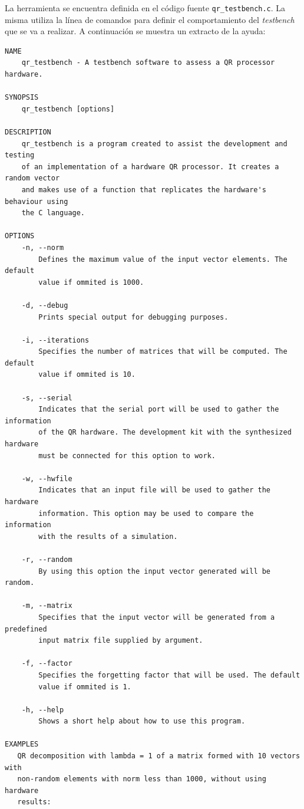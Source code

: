 La herramienta se encuentra definida en el código fuente \verb;qr_testbench.c;. La misma utiliza la línea de comandos para definir el comportamiento del \textit{testbench} que se va a realizar. A continuación se muestra un extracto de la ayuda:

\begin{lstlisting}[style=C]
NAME  
    qr_testbench - A testbench software to assess a QR processor hardware.

SYNOPSIS
    qr_testbench [options]
    
DESCRIPTION
    qr_testbench is a program created to assist the development and testing
    of an implementation of a hardware QR processor. It creates a random vector
    and makes use of a function that replicates the hardware's behaviour using
    the C language. 

OPTIONS
    -n, --norm    
        Defines the maximum value of the input vector elements. The default 
        value if ommited is 1000.
    
    -d, --debug
        Prints special output for debugging purposes.

    -i, --iterations
        Specifies the number of matrices that will be computed. The default 
        value if ommited is 10.
    
    -s, --serial
        Indicates that the serial port will be used to gather the information
        of the QR hardware. The development kit with the synthesized hardware
        must be connected for this option to work. 

    -w, --hwfile
        Indicates that an input file will be used to gather the hardware 
        information. This option may be used to compare the information 
        with the results of a simulation.
    
    -r, --random
        By using this option the input vector generated will be random.
    
    -m, --matrix
        Specifies that the input vector will be generated from a predefined 
        input matrix file supplied by argument.

    -f, --factor
        Specifies the forgetting factor that will be used. The default
        value if ommited is 1.
    
    -h, --help
        Shows a short help about how to use this program.

EXAMPLES
   QR decomposition with lambda = 1 of a matrix formed with 10 vectors with
   non-random elements with norm less than 1000, without using hardware
   results:


\end{lstlisting}
